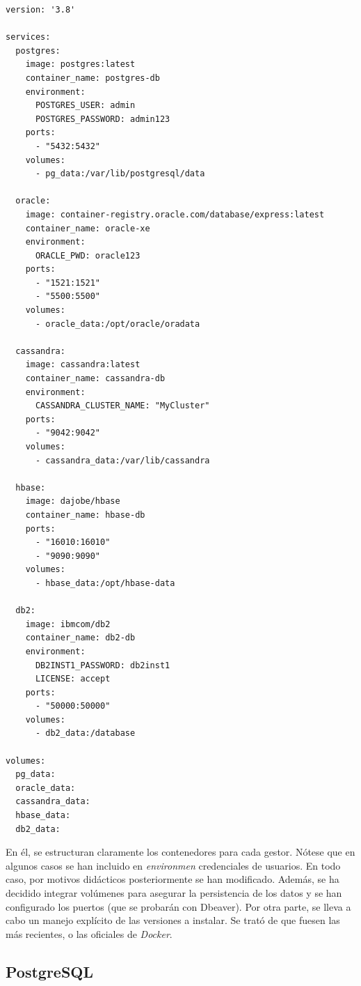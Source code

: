 \documentclass{article}
\begin{document}
\begin{mdframed}[backgroundcolor=gray!10, linewidth=1pt, roundcorner=5pt]
\begin{verbatim}
version: '3.8'

services:
  postgres:
    image: postgres:latest
    container_name: postgres-db
    environment:
      POSTGRES_USER: admin
      POSTGRES_PASSWORD: admin123
    ports:
      - "5432:5432"
    volumes:
      - pg_data:/var/lib/postgresql/data

  oracle:
    image: container-registry.oracle.com/database/express:latest
    container_name: oracle-xe
    environment:
      ORACLE_PWD: oracle123
    ports:
      - "1521:1521"
      - "5500:5500"
    volumes:
      - oracle_data:/opt/oracle/oradata

  cassandra:
    image: cassandra:latest
    container_name: cassandra-db
    environment:
      CASSANDRA_CLUSTER_NAME: "MyCluster"
    ports:
      - "9042:9042"
    volumes:
      - cassandra_data:/var/lib/cassandra

  hbase:
    image: dajobe/hbase
    container_name: hbase-db
    ports:
      - "16010:16010"
      - "9090:9090"
    volumes:
      - hbase_data:/opt/hbase-data

  db2:
    image: ibmcom/db2
    container_name: db2-db
    environment:
      DB2INST1_PASSWORD: db2inst1
      LICENSE: accept
    ports:
      - "50000:50000"
    volumes:
      - db2_data:/database

volumes:
  pg_data:
  oracle_data:
  cassandra_data:
  hbase_data:
  db2_data:
\end{verbatim}
\end{mdframed}

En él, se estructuran claramente los contenedores para cada gestor. Nótese que en algunos casos se han incluido en \textit{environmen} credenciales de usuarios. En todo caso, por motivos didácticos posteriormente se han modificado. Además, se ha decidido integrar volúmenes para asegurar la persistencia de los datos y se han configurado los puertos (que se probarán con Dbeaver).
Por otra parte, se lleva a cabo un manejo explícito de las versiones a instalar. Se trató de que fuesen las más recientes, o las oficiales de \textit{Docker}.



\subsection{PostgreSQL}\label{subsec:Instalación postgre}
\end{document}
